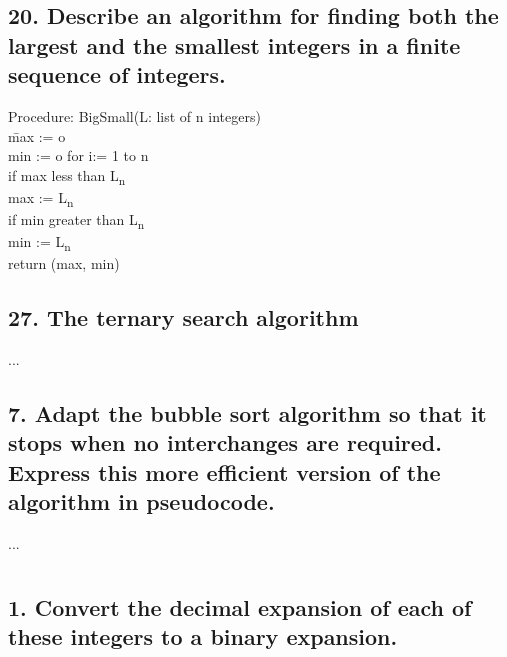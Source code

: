 \documentclass[11pt, oneside]{article} %
\numberwithin{equation}{section} %
\numberwithin{figure}{section} %
\numberwithin{table}{section} %
\begin{document}
\subsection{20. Describe an algorithm for finding both the largest and the smallest integers in a finite sequence of integers.}
\begin{tabbing}
Procedure: BigSmall(L: list of n integers) \\
\=  max := o \= \= \= \= \= \\
min := o
for i:= 1 to n\\
\> \> if max less than L\textsubscript{n} \\
\> \>\> \> max := L\textsubscript{n} \\
\> \> if min greater than L\textsubscript{n} \\
\> \>\> \> min := L\textsubscript{n} \\
return (max, min)
\end{tabbing}

\subsection{27. The ternary search algorithm }
...

\subsection{7. Adapt the bubble sort algorithm so that it stops when no interchanges are required. Express this more efficient version of the algorithm in pseudocode.}
...

\section{}
\subsection{1. Convert the decimal expansion of each of these integers to a binary expansion.}
\end{document}
